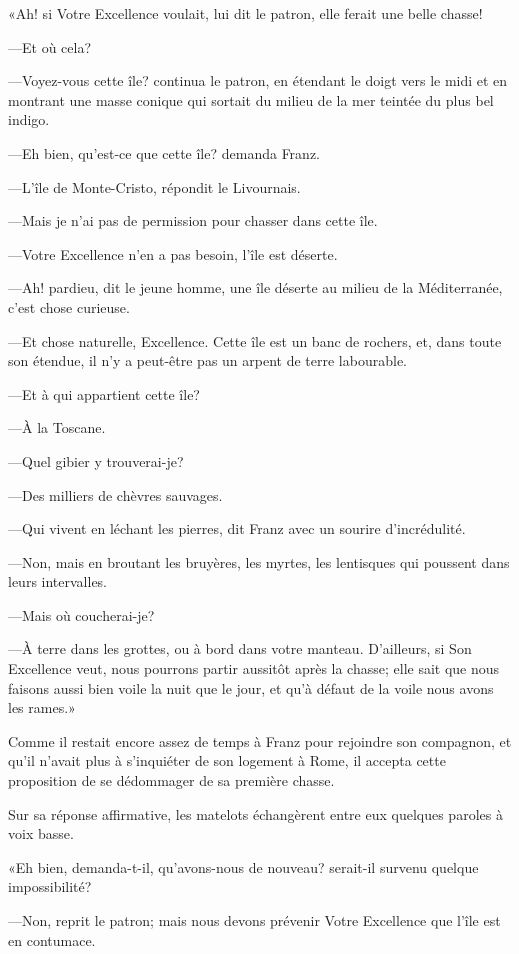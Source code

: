 «Ah! si Votre Excellence voulait, lui dit le patron, elle ferait une belle chasse!

—Et où cela?

—Voyez-vous cette île? continua le patron, en étendant le doigt vers le midi et en montrant une masse conique qui sortait du milieu de la mer teintée du plus bel indigo.

—Eh bien, qu'est-ce que cette île? demanda Franz.

—L'île de Monte-Cristo, répondit le Livournais.

—Mais je n'ai pas de permission pour chasser dans cette île.

—Votre Excellence n'en a pas besoin, l'île est déserte.

—Ah! pardieu, dit le jeune homme, une île déserte au milieu de la Méditerranée, c'est chose curieuse.

—Et chose naturelle, Excellence. Cette île est un banc de rochers, et, dans toute son étendue, il n'y a peut-être pas un arpent de terre labourable.

—Et à qui appartient cette île?

—À la Toscane.

—Quel gibier y trouverai-je?

—Des milliers de chèvres sauvages.

—Qui vivent en léchant les pierres, dit Franz avec un sourire d'incrédulité.

—Non, mais en broutant les bruyères, les myrtes, les lentisques qui poussent dans leurs intervalles.

—Mais où coucherai-je?

—À terre dans les grottes, ou à bord dans votre manteau. D'ailleurs, si Son Excellence veut, nous pourrons partir aussitôt après la chasse; elle sait que nous faisons aussi bien voile la nuit que le jour, et qu'à défaut de la voile nous avons les rames.»

Comme il restait encore assez de temps à Franz pour rejoindre son compagnon, et qu'il n'avait plus à s'inquiéter de son logement à Rome, il accepta cette proposition de se dédommager de sa première chasse.

Sur sa réponse affirmative, les matelots échangèrent entre eux quelques paroles à voix basse.

«Eh bien, demanda-t-il, qu'avons-nous de nouveau? serait-il survenu quelque impossibilité?

—Non, reprit le patron; mais nous devons prévenir Votre Excellence que l'île est en contumace.

